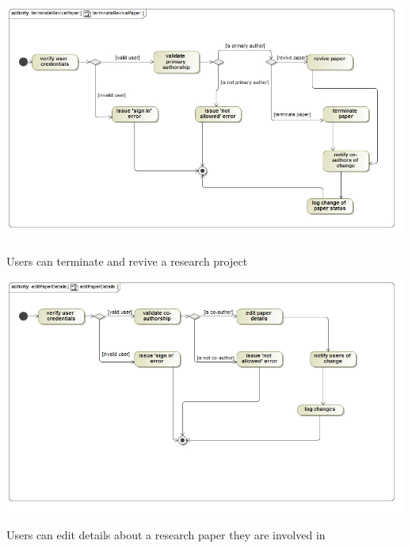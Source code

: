 \documentclass[a4paper,12pt]{report}
\begin{document}
\begin{flushleft}
	\includegraphics[scale=0.5]{./images/act__terminateRevivePaper__terminateRevivePaper.jpg} 
	\begin{center}
		Users can terminate and revive a research project
	\end{center}

	\includegraphics[scale=0.5]{./images/act__editPaperDetails__editPaperDetails.jpg} 
	\begin{center}
		Users can edit details about a research paper they are involved in
	\end{center}
\end{flushleft}

\newpage
\end{document}
